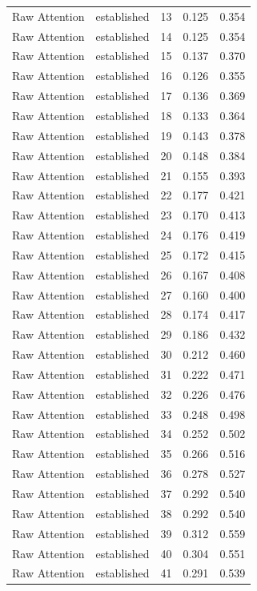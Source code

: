 \begin{tabular}{llrrr}
Raw Attention & established & 13 & 0.125 & 0.354 \\
Raw Attention & established & 14 & 0.125 & 0.354 \\
Raw Attention & established & 15 & 0.137 & 0.370 \\
Raw Attention & established & 16 & 0.126 & 0.355 \\
Raw Attention & established & 17 & 0.136 & 0.369 \\
Raw Attention & established & 18 & 0.133 & 0.364 \\
Raw Attention & established & 19 & 0.143 & 0.378 \\
Raw Attention & established & 20 & 0.148 & 0.384 \\
Raw Attention & established & 21 & 0.155 & 0.393 \\
Raw Attention & established & 22 & 0.177 & 0.421 \\
Raw Attention & established & 23 & 0.170 & 0.413 \\
Raw Attention & established & 24 & 0.176 & 0.419 \\
Raw Attention & established & 25 & 0.172 & 0.415 \\
Raw Attention & established & 26 & 0.167 & 0.408 \\
Raw Attention & established & 27 & 0.160 & 0.400 \\
Raw Attention & established & 28 & 0.174 & 0.417 \\
Raw Attention & established & 29 & 0.186 & 0.432 \\
Raw Attention & established & 30 & 0.212 & 0.460 \\
Raw Attention & established & 31 & 0.222 & 0.471 \\
Raw Attention & established & 32 & 0.226 & 0.476 \\
Raw Attention & established & 33 & 0.248 & 0.498 \\
Raw Attention & established & 34 & 0.252 & 0.502 \\
Raw Attention & established & 35 & 0.266 & 0.516 \\
Raw Attention & established & 36 & 0.278 & 0.527 \\
Raw Attention & established & 37 & 0.292 & 0.540 \\
Raw Attention & established & 38 & 0.292 & 0.540 \\
Raw Attention & established & 39 & 0.312 & 0.559 \\
Raw Attention & established & 40 & 0.304 & 0.551 \\
Raw Attention & established & 41 & 0.291 & 0.539 \\

\end{tabular}
